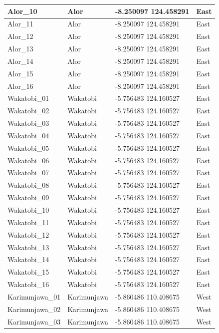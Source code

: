 \documentclass[
]{article}
\begin{document}
\begin{table}
\begin{tabular}{l|l|l|l}
\hline
Alor\_10 & Alor & -8.250097 124.458291 & East\\
\hline
Alor\_11 & Alor & -8.250097 124.458291 & East\\
\hline
Alor\_12 & Alor & -8.250097 124.458291 & East\\
\hline
Alor\_13 & Alor & -8.250097 124.458291 & East\\
\hline
Alor\_14 & Alor & -8.250097 124.458291 & East\\
\hline
Alor\_15 & Alor & -8.250097 124.458291 & East\\
\hline
Alor\_16 & Alor & -8.250097 124.458291 & East\\
\hline
Wakatobi\_01 & Wakatobi & -5.756483 124.160527 & East\\
\hline
Wakatobi\_02 & Wakatobi & -5.756483 124.160527 & East\\
\hline
Wakatobi\_03 & Wakatobi & -5.756483 124.160527 & East\\
\hline
Wakatobi\_04 & Wakatobi & -5.756483 124.160527 & East\\
\hline
Wakatobi\_05 & Wakatobi & -5.756483 124.160527 & East\\
\hline
Wakatobi\_06 & Wakatobi & -5.756483 124.160527 & East\\
\hline
Wakatobi\_07 & Wakatobi & -5.756483 124.160527 & East\\
\hline
Wakatobi\_08 & Wakatobi & -5.756483 124.160527 & East\\
\hline
Wakatobi\_09 & Wakatobi & -5.756483 124.160527 & East\\
\hline
Wakatobi\_10 & Wakatobi & -5.756483 124.160527 & East\\
\hline
Wakatobi\_11 & Wakatobi & -5.756483 124.160527 & East\\
\hline
Wakatobi\_12 & Wakatobi & -5.756483 124.160527 & East\\
\hline
Wakatobi\_13 & Wakatobi & -5.756483 124.160527 & East\\
\hline
Wakatobi\_14 & Wakatobi & -5.756483 124.160527 & East\\
\hline
Wakatobi\_15 & Wakatobi & -5.756483 124.160527 & East\\
\hline
Wakatobi\_16 & Wakatobi & -5.756483 124.160527 & East\\
\hline
Karimunjawa\_01 & Karimunjawa & -5.860486 110.408675 & West\\
\hline
Karimunjawa\_02 & Karimunjawa & -5.860486 110.408675 & West\\
\hline
Karimunjawa\_03 & Karimunjawa & -5.860486 110.408675 & West\\

\end{tabular}
\end{table}
\end{document}
